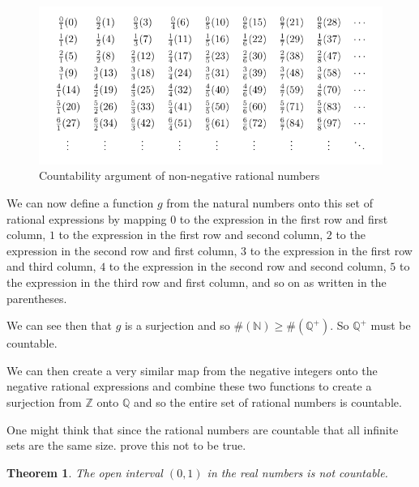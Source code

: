 \documentclass[
]{book}
\newtheorem{theorem}{Theorem}[chapter]
\theoremstyle{definition}
\theoremstyle{definition}
\theoremstyle{definition}
\theoremstyle{remark}
\begin{document}
\begin{figure}

{\centering \includegraphics[width=1\linewidth]{tikz/table-natural-integers3} 

}

\caption{Countability argument of non-negative rational numbers}\label{fig:rational-countable}
\end{figure}

We can now define a function \(g\) from the natural numbers onto this set of rational expressions by mapping \(0\) to the expression in the first row and first column, \(1\) to the expression in the first row and second column, \(2\) to the expression in the second row and first column, \(3\) to the expression in the first row and third column, \(4\) to the expression in the second row and second column, \(5\) to the expression in the third row and first column, and so on as written in the parentheses.

We can see then that \(g\) is a surjection and so \(\#(\mathbb{N}) \geq \#(\mathbb{Q}^+)\). So \(\mathbb{Q}^+\) must be countable.

We can then create a very similar map from the negative integers onto the negative rational expressions and combine these two functions to create a surjection from \(\mathbb{Z}\) onto \(\mathbb{Q}\) and so the entire set of rational numbers is countable.

One might think that since the rational numbers are countable that all infinite sets are the same size. \cite{Cantor} prove this not to be true.

\begin{theorem}
\protect\hypertarget{thm:unnamed-chunk-148}{}{\label{thm:unnamed-chunk-148} }The open interval \((0,1)\) in the real numbers is not countable.
\end{theorem}
\end{document}
